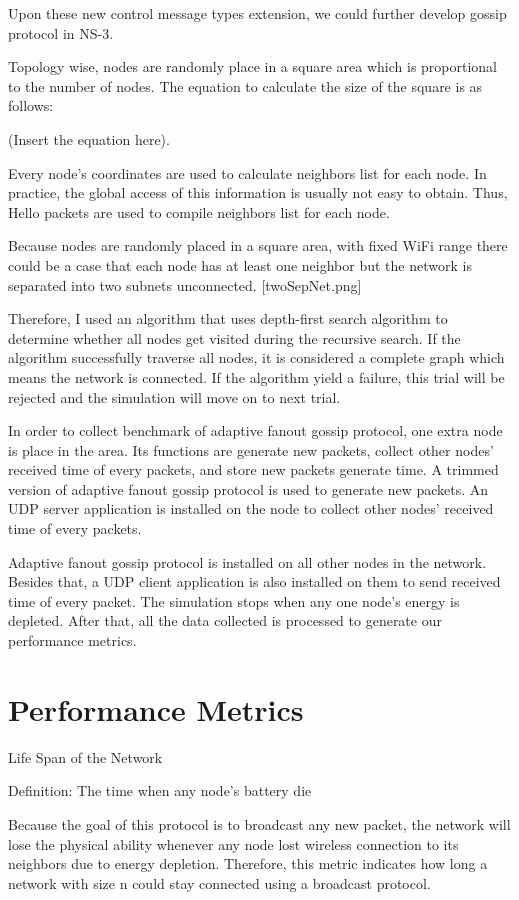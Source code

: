 Upon these new control message types extension, we could further develop gossip protocol in NS-3.



Topology wise, nodes are randomly place in a square area which is proportional to the number of nodes. The equation to calculate the size of the square is as follows:

(Insert the equation here).

Every node's coordinates are used to calculate neighbors list for each node. In practice, the global access of this information is usually not easy to obtain. Thus, Hello packets are used to compile neighbors list for each node.

Because nodes are randomly placed in a square area, with fixed WiFi range there could be a case that each node has at least one neighbor but the network is separated into two subnets unconnected. [twoSepNet.png]

Therefore, I used an algorithm that uses depth-first search algorithm to determine whether all nodes get visited during the recursive search. If the algorithm successfully traverse all nodes, it is considered a complete graph which means the network is connected. If the algorithm yield a failure, this trial will be rejected and the simulation will move on to next trial.

In order to collect benchmark of adaptive fanout gossip protocol, one extra node is place in the area. Its functions are generate new packets, collect other nodes' received time of every packets, and store new packets generate time. A trimmed version of adaptive fanout gossip protocol is used to generate new packets. An UDP server application is installed on the node to collect other nodes' received time of every packets.

Adaptive fanout gossip protocol is installed on all other nodes in the network. Besides that, a UDP client application is also installed on them to send received time of every packet. The simulation stops when any one node's energy is depleted. After that, all the data collected is processed to generate our performance metrics. 

\section{Performance Metrics}
Life Span of the Network

Definition: The time when any node's battery die

Because the goal of this protocol is to broadcast any new packet, the network will lose the physical ability whenever any node lost wireless connection to its neighbors due to energy depletion. Therefore, this metric indicates how long a network with size n could stay connected using a broadcast protocol.

